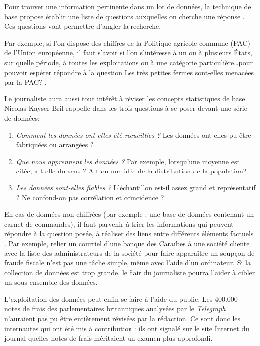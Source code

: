Pour trouver une information pertinente dans un lot de données, la technique de base propose établir une liste de questions auxquelles on cherche une réponse \cite{handbookfr}. Ces questions vont permettre d'angler la recherche. 

Par exemple, si l'on dispose des chiffres de la Politique agricole commune (PAC) de l'Union européenne, il faut s'avoir si l'on s'intéresse à un ou à plusieurs États, sur quelle période, à toutes les exploitations ou à une catégorie particulière\dots pour pouvoir espérer répondre à la question \og Les très petites fermes sont-elles menacées par la PAC? \fg. 

Le journaliste aura aussi tout intérêt à réviser les concepts statistiques de base. 
Nicolas Kayser-Bril rappelle dans \cite{handbookfr} les trois questions à se poser 
devant une série de données:

\begin{enumerate}
\item \textit{Comment les données ont-elles été recueillies ?} Les données ont-elles pu être fabriquées ou arrangées ? 
\item \textit{Que nous apprennent les données ?} Par exemple, lorsqu'une moyenne est citée, a-t-elle du sens ? A-t-on une idée de la distribution de la population?
\item \textit{Les données sont-elles fiables ?} L'échantillon est-il assez grand et 
représentatif ? Ne confond-on pas corrélation et coïncidence ?
\end{enumerate}

En cas de données non-chiffrées (par exemple : une base de données contenant un carnet
de commandes), il faut parvenir à trier les informations qui peuvent répondre à la 
question posée, à réaliser des liens entre différents éléments factuels \cite{handbook}.
Par exemple, relier un courriel d'une banque des Caraïbes à une société cliente avec 
la liste des administrateurs de la société pour faire apparaître un soupçon de fraude 
fiscale n'est pas une tâche simple, même avec l'aide d'un ordinateur.
Si la collection de données est trop grande, le flair du journaliste pourra l'aider
à cibler un sous-ensemble des données.

L'exploitation des données peut enfin se faire à l'aide du public. Les 400.000 notes 
de frais des parlementaires britanniques analysées par le \textit{Telegraph} n'auraient pas pu être entièrement révisées par la rédaction. Ce sont donc les internautes qui ont été mis à contribution : ils ont signalé sur le site Internet du journal quelles notes de frais méritaient un examen plus approfondi. 


